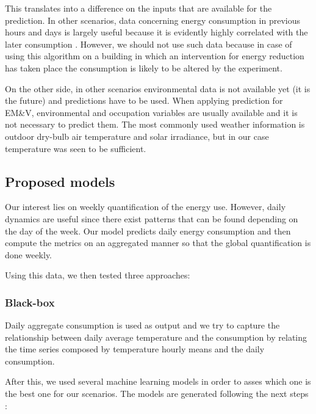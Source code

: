 \documentclass[10pt, conference, compsocconf]{IEEEtran}
\begin{document}
This translates into a difference on the inputs that are available for the prediction. In other scenarios, data concerning energy consumption in previous hours and days is largely useful because it is evidently highly correlated with the later consumption \cite{aman2014empirical}. However, we should not use such data because in case of using this algorithm on a building in which an intervention for energy reduction has taken place the consumption is likely to be altered by the experiment.

On the other side, in other scenarios environmental data is not available yet (it is the future) and predictions have to be used. When applying prediction for EM\&V, environmental and occupation variables are usually available and it is not necessary to predict them. The most commonly used weather information is outdoor dry-bulb air temperature and solar irradiance, but in our case temperature was seen to be sufficient.



\subsection{Proposed models}

Our interest lies on weekly quantification of the energy use. However, daily dynamics are useful since there exist patterns that can be found depending on the day of the week. Our model predicts daily energy consumption and then compute the metrics on an aggregated manner so that the global quantification is done weekly.

Using this data, we then tested three approaches:

\subsubsection{Black-box}

Daily aggregate consumption is used as output and we try to capture the relationship between daily average temperature and the consumption by relating the time series composed by temperature hourly means and the daily consumption.

After this, we used several machine learning models in order to asses which one is the best one for our scenarios. The models are generated  following the next steps \cite{gonzalez2016towards}:
\end{document}
